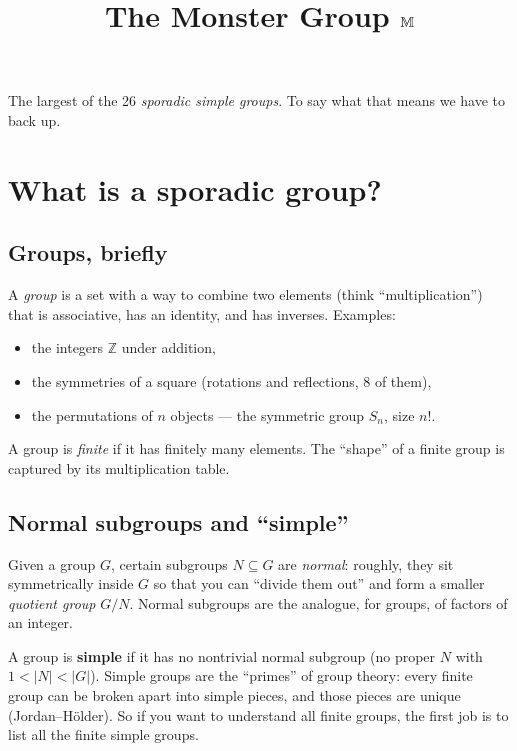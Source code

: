 \documentclass[11pt]{article}
\title{\textbf{The Monster Group} $\mathbb{M}$}
\author{}
\date{}
\newcommand{\Z}{\mathbb{Z}}
\begin{document}
\maketitle

\vspace{-2em}

The largest of the 26 \emph{sporadic simple groups}. To say what that
means we have to back up.

\section*{What is a sporadic group?}

\subsection*{Groups, briefly}

A \emph{group} is a set with a way to combine two elements (think
``multiplication'') that is associative, has an identity, and has
inverses. Examples:
\begin{itemize}[leftmargin=*, itemsep=2pt]
  \item the integers $\Z$ under addition,
  \item the symmetries of a square (rotations and reflections, 8 of them),
  \item the permutations of $n$ objects --- the symmetric group $S_n$,
        size $n!$.
\end{itemize}
A group is \emph{finite} if it has finitely many elements. The
``shape'' of a finite group is captured by its multiplication table.

\subsection*{Normal subgroups and ``simple''}

Given a group $G$, certain subgroups $N \subseteq G$ are
\emph{normal}: roughly, they sit symmetrically inside $G$ so that you
can ``divide them out'' and form a smaller \emph{quotient group}
$G/N$. Normal subgroups are the analogue, for groups, of factors
of an integer.

A group is \textbf{simple} if it has no nontrivial normal subgroup
(no proper $N$ with $1 < |N| < |G|$). Simple groups are the
``primes'' of group theory: every finite group can be broken apart
into simple pieces, and those pieces are unique (Jordan--H\"older).
So if you want to understand all finite groups, the first job is to
list all the finite simple groups.
\end{document}
